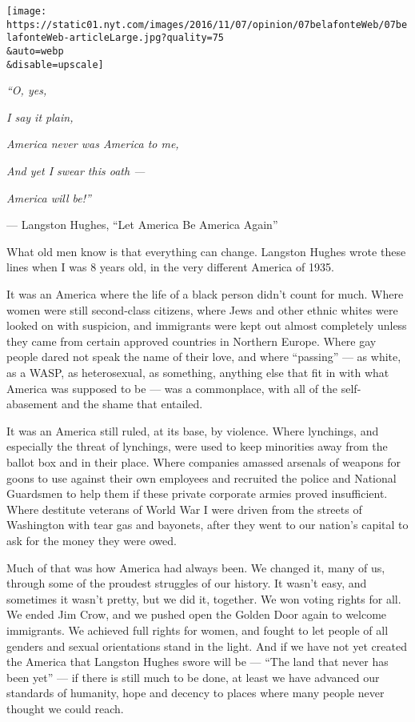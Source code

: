 \texttt{[image: https://static01.nyt.com/images/2016/11/07/opinion/07belafonteWeb/07belafonteWeb-articleLarge.jpg?quality=75\\\&auto=webp\\\&disable=upscale]}

\emph{``O, yes,}

\emph{I say it plain,}

\emph{America never was America to me,}

\emph{And yet I swear this oath ---}

\emph{America will be!''}

--- Langston Hughes, ``Let America Be America Again''

What old men know is that everything can change. Langston Hughes wrote
these lines when I was 8 years old, in the very different America of
1935.

It was an America where the life of a black person didn't count for
much. Where women were still second-class citizens, where Jews and other
ethnic whites were looked on with suspicion, and immigrants were kept
out almost completely unless they came from certain approved countries
in Northern Europe. Where gay people dared not speak the name of their
love, and where ``passing'' --- as white, as a WASP, as heterosexual, as
something, anything else that fit in with what America was supposed to
be --- was a commonplace, with all of the self-abasement and the shame
that entailed.

It was an America still ruled, at its base, by violence. Where
lynchings, and especially the threat of lynchings, were used to keep
minorities away from the ballot box and in their place. Where companies
amassed arsenals of weapons for goons to use against their own employees
and recruited the police and National Guardsmen to help them if these
private corporate armies proved insufficient. Where destitute veterans
of World War I were driven from the streets of Washington with tear gas
and bayonets, after they went to our nation's capital to ask for the
money they were owed.

Much of that was how America had always been. We changed it, many of us,
through some of the proudest struggles of our history. It wasn't easy,
and sometimes it wasn't pretty, but we did it, together. We won voting
rights for all. We ended Jim Crow, and we pushed open the Golden Door
again to welcome immigrants. We achieved full rights for women, and
fought to let people of all genders and sexual orientations stand in the
light. And if we have not yet created the America that Langston Hughes
swore will be --- ``The land that never has been yet'' --- if there is
still much to be done, at least we have advanced our standards of
humanity, hope and decency to places where many people never thought we
could reach.

